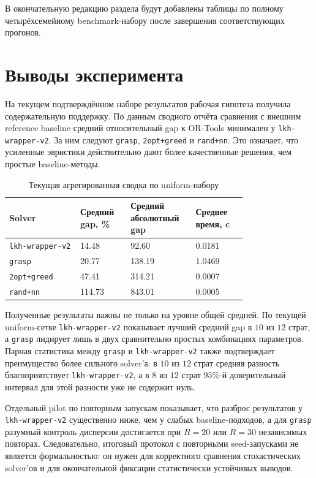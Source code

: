 \documentclass[a4paper,12pt]{article}
\begin{document}
В окончательную редакцию раздела будут добавлены таблицы по полному четырёхсемейному benchmark-набору после завершения соответствующих прогонов.

\section{Выводы эксперимента}

На текущем подтверждённом наборе результатов рабочая гипотеза получила содержательную поддержку. По данным сводного отчёта сравнения с внешним reference baseline средний относительный gap к OR-Tools минимален у \texttt{lkh-wrapper-v2}. За ним следуют \texttt{grasp}, \texttt{2opt+greed} и \texttt{rand+nn}. Это означает, что усиленные эвристики действительно дают более качественные решения, чем простые baseline-методы.

\begin{table}[H]
\centering
\caption{Текущая агрегированная сводка по uniform-набору}
\begin{tabular}{L{0.25\linewidth}L{0.17\linewidth}L{0.17\linewidth}L{0.18\linewidth}}
\toprule
Solver & Средний gap, \% & Средний абсолютный gap & Среднее время, c \\
\midrule
\texttt{lkh-wrapper-v2} & 14.48 & 92.60 & 0.0181 \\
\texttt{grasp} & 20.77 & 138.19 & 1.0469 \\
\texttt{2opt+greed} & 47.41 & 314.21 & 0.0007 \\
\texttt{rand+nn} & 114.73 & 843.01 & 0.0005 \\
\bottomrule
\end{tabular}
\end{table}

Полученные результаты важны не только на уровне общей средней. По текущей uniform-сетке \texttt{lkh-wrapper-v2} показывает лучший средний gap в \(10\) из \(12\) страт, а \texttt{grasp} лидирует лишь в двух сравнительно простых комбинациях параметров. Парная статистика между \texttt{grasp} и \texttt{lkh-wrapper-v2} также подтверждает преимущество более сильного solver'а: в \(10\) из \(12\) страт средняя разность благоприятствует \texttt{lkh-wrapper-v2}, а в \(8\) из \(12\) страт \(95\%\)-й доверительный интервал для этой разности уже не содержит нуль.

Отдельный pilot по повторным запускам показывает, что разброс результатов у \texttt{lkh-wrapper-v2} существенно ниже, чем у слабых baseline-подходов, а для \texttt{grasp} разумный контроль дисперсии достигается при \(R=20\) или \(R=30\) независимых повторах. Следовательно, итоговый протокол с повторными seed-запусками не является формальностью: он нужен для корректного сравнения стохастических solver'ов и для окончательной фиксации статистически устойчивых выводов.
\end{document}
